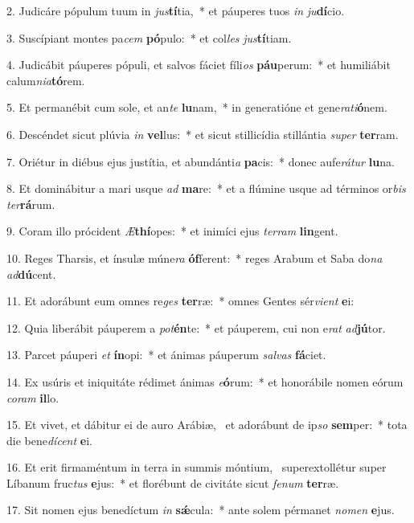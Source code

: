 2. Judicáre pópulum tuum in \textit{jus}\textbf{tí}tia,~*  et páuperes tuos \textit{in} \textit{ju}\textbf{dí}cio.\

3. Suscípiant montes pa\textit{cem} \textbf{pó}pulo:~*  et col\textit{les} \textit{jus}\textbf{tí}tiam.\

4. Judicábit páuperes pópuli, et salvos fáciet fíli\textit{os} \textbf{páu}perum:~*  et humiliábit calum\textit{ni}\textit{a}\textbf{tó}rem.\

5. Et permanébit cum sole, et an\textit{te} \textbf{lu}nam,~*  in generatióne et gene\textit{ra}\textit{ti}\textbf{ó}nem.\

6. Descéndet sicut plúvia \textit{in} \textbf{vel}lus:~*  et sicut stillicídia stillántia \textit{su}\textit{per} \textbf{ter}ram.\

7. Oriétur in diébus ejus justítia, et abundánti\textit{a} \textbf{pa}cis:~*  donec aufe\textit{rá}\textit{tur} \textbf{lu}na.\

8. Et dominábitur a mari usque \textit{ad} \textbf{ma}re:~*  et a flúmine usque ad términos or\textit{bis} \textit{ter}\textbf{rá}rum.\

9. Coram illo prócident \textit{Æ}\textbf{thí}opes:~*  et inimíci ejus \textit{ter}\textit{ram} \textbf{lin}gent.\

10. Reges Tharsis, et ínsulæ múne\textit{ra} \textbf{óf}ferent:~*  reges Arabum et Saba do\textit{na} \textit{ad}\textbf{dú}cent.\

11. Et adorábunt eum omnes re\textit{ges} \textbf{ter}ræ:~*  omnes Gentes sér\textit{vi}\textit{ent} \textbf{e}i:\

12. Quia liberábit páuperem a \textit{pot}\textbf{én}te:~*  et páuperem, cui non e\textit{rat} \textit{ad}\textbf{jú}tor.\

13. Parcet páuperi \textit{et} \textbf{ín}opi:~*  et ánimas páuperum \textit{sal}\textit{vas} \textbf{fá}ciet.\

14. Ex usúris et iniquitáte rédimet ánimas \textit{e}\textbf{ó}rum:~*  et honorábile nomen eórum \textit{co}\textit{ram} \textbf{il}lo.\

15. Et vivet, et dábitur ei de auro Arábiæ, \dag\  et adorábunt de ip\textit{so} \textbf{sem}per:~*  tota die bene\textit{dí}\textit{cent} \textbf{e}i.\

16. Et erit firmaméntum in terra in summis móntium, \dag\  superextollétur super Líbanum fruc\textit{tus} \textbf{e}jus:~*  et florébunt de civitáte sicut \textit{fe}\textit{num} \textbf{ter}ræ.\

17. Sit nomen ejus benedíctum \textit{in} \textbf{sǽ}cula:~*  ante solem pérmanet \textit{no}\textit{men} \textbf{e}jus.\

